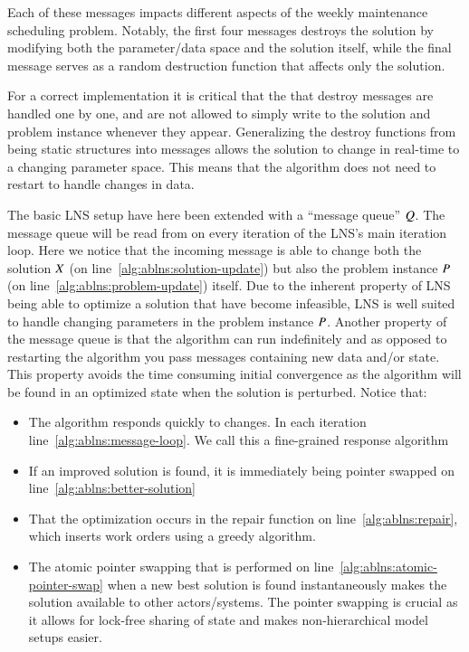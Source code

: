 Each of these messages impacts different aspects of the weekly maintenance
scheduling problem. Notably, the first four messages destroys the solution by
modifying both the parameter/data space and the solution itself, while the final
message serves as a random destruction function that affects only the solution.

For a correct implementation it is critical that the that destroy messages
are  handled one by one, and are not allowed to simply write to the solution and
problem instance whenever they appear. Generalizing the destroy functions from being
static structures into messages allows the solution to change in real-time to a
changing parameter space. This means that the algorithm does not need to restart
to handle changes in data.



The basic LNS setup have here been extended with a ``message queue'' $
Q$. The message queue will be read from on every iteration of
the LNS's main iteration loop. Here we notice that the incoming message is
able to change both the solution $X$ (on line~\ref{alg:ablns:solution-update}) but also the problem instance $
P$ (on line~\ref{alg:ablns:problem-update}) itself. Due to the inherent property of LNS being able to
optimize a solution that have become infeasible, LNS is well suited to handle
changing parameters in the problem instance $P$. Another
property of the message queue is  that the algorithm can run indefinitely and
as opposed to restarting the algorithm you pass messages containing new data
and/or state. This property avoids the time consuming initial convergence as the
algorithm will be found in an optimized state when the solution is perturbed.
Notice that:

\begin{itemize}
    \item The algorithm responds quickly to changes. In each iteration
		line~\ref{alg:ablns:message-loop}. We
		call this a fine-grained response algorithm     
	\item If an improved
		solution is found, it is immediately being pointer swapped
		on line~\ref{alg:ablns:better-solution}
	\item That the optimization occurs in the repair function on
		line~\ref{alg:ablns:repair},
		which inserts work orders using a greedy algorithm.  	
	\item The atomic pointer swapping that is performed on
		line~\ref{alg:ablns:atomic-pointer-swap} when a
		new best solution is found instantaneously makes the solution available to other
		actors/systems. The pointer swapping is crucial as it allows for lock-free
		sharing of state and makes non-hierarchical model setups easier.
\end{itemize}

